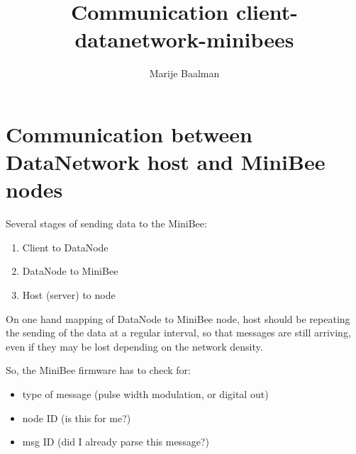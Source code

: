 \documentclass[letterpaper,10pt]{article}
\title{Communication client-datanetwork-minibees}
\author{Marije Baalman}
\begin{document}
\maketitle



\section{Communication between DataNetwork host and MiniBee nodes}

Several stages of sending data to the MiniBee:

\begin{enumerate}
 \item Client to DataNode
 \item DataNode to MiniBee
 \item Host (server) to node
\end{enumerate}

On one hand mapping of DataNode to MiniBee node, host should be repeating the sending of the data at a regular interval, so that messages are still arriving, even if they may be lost depending on the network density.

So, the MiniBee firmware has to check for:
\begin{itemize}
 \item type of message (pulse width modulation, or digital out)
 \item node ID (is this for me?)
 \item msg ID (did I already parse this message?)
\end{itemize}
\end{document}
